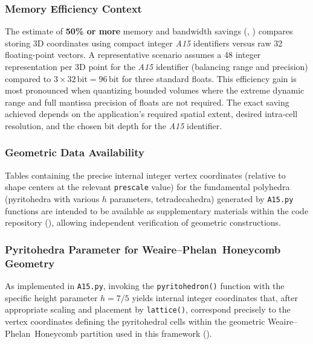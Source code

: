\documentclass[10pt]{article}
\def\AAAB{\textit{A15}}
\def\WP{Weaire--Phelan}
\def\WPH{\WP{}~Honeycomb}
\begin{document}
\subsubsection{Memory Efficiency Context}\label{subsubsec-notes-memory}
The estimate of \textbf{50\% or more} memory and bandwidth savings (, ) compares storing 3D coordinates using compact integer \AAAB{} identifiers versus raw \SI{32}{\bit} floating-point vectors. A representative scenario assumes a \SI{48}{\bit} integer representation per 3D point for the \AAAB{} identifier (balancing range and precision) compared to $3 \times 32\,\text{bit} = 96\,\text{bit}$ for three standard floats. This efficiency gain is most pronounced when quantizing bounded volumes where the extreme dynamic range and full mantissa precision of floats are not required. The exact saving achieved depends on the application's required spatial extent, desired intra-cell resolution, and the chosen bit depth for the \AAAB{} identifier.

\subsubsection{Geometric Data Availability}\label{subsubsec-notes-geometry}
Tables containing the precise internal integer vertex coordinates (relative to shape centers at the relevant \texttt{prescale} value) for the fundamental polyhedra (pyritohedra with various $h$ parameters, tetradecahedra) generated by \texttt{A15.py} functions are intended to be available as supplementary materials within the code repository (), allowing independent verification of geometric constructions.

\subsubsection{Pyritohedra Parameter for \WPH{} Geometry}\label{subsubsec-notes-h75}
As implemented in \texttt{A15.py}, invoking the \texttt{pyritohedron()} function with the specific height parameter $h=7/5$ yields internal integer coordinates that, after appropriate scaling and placement by \texttt{lattice()}, correspond precisely to the vertex coordinates defining the pyritohedral cells within the geometric \WPH{} partition used in this framework ().
\end{document}
